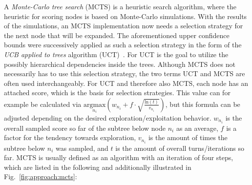 A \textit{Monte-Carlo tree search} (MCTS) is a heuristic search algorithm, where the heuristic for scoring nodes is based on Monte-Carlo simulations.
With the results of the simulations, an MCTS implementation now needs a selection strategy for the next node that will be expanded.
The aforementioned upper confidence bounds were successively applied as such a selection strategy in the form of the \textit{UCB applied to trees} algorithm (UCT)~\cite{Kocsis-UCT}.
For UCT is the goal to utilize the possibly hierarchical dependencies inside the trees.
Although MCTS does not necessarily has to use this selection strategy, the two terms UCT and MCTS are often used interchangeably.\newline
For UCT and therefore also MCTS, each node has an attached score, which is the basis for selection strategies.
This value can for example be calculated via $\underset{n_i}{\textrm{argmax}} \left( w_{n_i} + f \cdot \sqrt{\frac{\textrm{ln}(t)}{v_{n_i}}} \right)$, but this formula can be adjusted depending on the desired exploration/exploitation behavior.
$w_{n_i}$ is the overall sampled score so far of the subtree below node $n_i$ as an average, $f$ is a factor for the tendency towards exploration, $v_{n_i}$ is the amount of times the subtree below $n_i$ was sampled, and $t$ is the amount of overall turns/iterations so far.\newline
MCTS is usually defined as an algorithm with an iteration of four steps, which are listed in the following and additionally illustrated in Fig.~\ref{fig:approach:mcts}:
